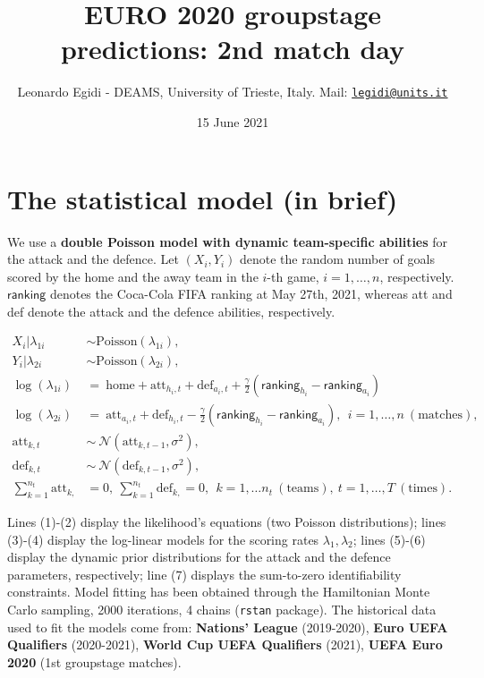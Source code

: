 \documentclass[
  10pt,
]{article}
\title{EURO 2020 groupstage predictions: 2nd match day}
\author{Leonardo Egidi - DEAMS, University of Trieste, Italy. Mail:
\href{mailto:legidi@units.it}{\nolinkurl{legidi@units.it}}}
\date{15 June 2021}
\begin{document}
\maketitle

{
\setcounter{tocdepth}{2}
\tableofcontents
}
\hypertarget{the-statistical-model-in-brief}{%
\section{The statistical model (in
brief)}\label{the-statistical-model-in-brief}}

We use a \textbf{double Poisson model with dynamic team-specific
abilities} for the attack and the defence. Let \((X_{i}, Y_{i})\) denote
the random number of goals scored by the home and the away team in the
\(i\)-th game, \(i=1,\ldots,n\), respectively. \(\mathsf{ranking}\)
denotes the Coca-Cola FIFA ranking at May 27th, 2021, whereas att and
def denote the attack and the defence abilities, respectively.

\begin{align}
X_i| \lambda_{1i} &\sim \text{Poisson}(\lambda_{1i}),\\
Y_i|\lambda_{2i} &\sim \text{Poisson}(\lambda_{2i}),  \\
\log(\lambda_{1i}) &=\  \text{home} + \text{att}_{h_i, t}+ \text{def}_{a_i,t} + \frac{\gamma}{2}(\mathsf{ranking}_{h_i}-\mathsf{ranking}_{a_i}) \\
\log(\lambda_{2i}) & =\    \text{att}_{a_i,t} + \text{def}_{h_i,t} - \frac{\gamma}{2}(\mathsf{ranking}_{h_i}-\mathsf{ranking}_{a_i}), \ \ i=1,\ldots,n\ (\text{matches}), \\
\text{att}_{k, t} &\sim \ \mathcal{N}(\text{att}_{k, t-1}, \sigma^2), \\
\text{def}_{k, t} &\sim \  \mathcal{N}(\text{def}_{k, t-1}, \sigma^2),\\
\sum_{k=1}^{n_t} \text{att}_{k, }&=0, \  \sum_{k=1}^{n_t}\text{def}_{k, }=0, \ \ k=1,\ldots n_t \ (\text{teams}), \  t=1,\ldots, T \ (\text{times}).
\label{eq:scoring_rue}
\end{align}

Lines (1)-(2) display the likelihood's equations (two Poisson
distributions); lines (3)-(4) display the log-linear models for the
scoring rates \(\lambda_{1}, \lambda_{2}\); lines (5)-(6) display the
dynamic prior distributions for the attack and the defence parameters,
respectively; line (7) displays the sum-to-zero identifiability
constraints. Model fitting has been obtained through the Hamiltonian
Monte Carlo sampling, 2000 iterations, 4 chains (\texttt{rstan}
package). The historical data used to fit the models come from:
\textbf{Nations' League} (2019-2020), \textbf{Euro UEFA Qualifiers}
(2020-2021), \textbf{World Cup UEFA Qualifiers} (2021), \textbf{UEFA
Euro 2020} (1st groupstage matches).
\end{document}

